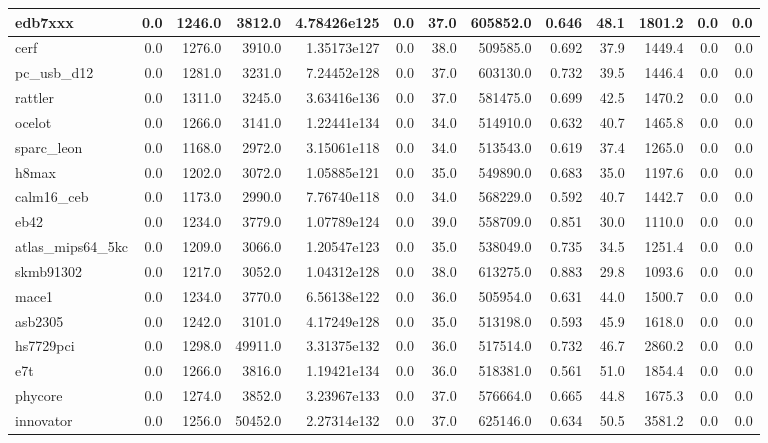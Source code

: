 \begin{tabular}{|l r r r r| r r r r r r | r r|}
\hline
edb7xxx & 0.0 & 1246.0 & 3812.0 & 4.78426e125 & 0.0 & 37.0 & 605852.0 & 0.646 & 48.1 & 1801.2 & 0.0 & 0.0 \\
\hline
cerf & 0.0 & 1276.0 & 3910.0 & 1.35173e127 & 0.0 & 38.0 & 509585.0 & 0.692 & 37.9 & 1449.4 & 0.0 & 0.0 \\
\hline
pc\_usb\_d12 & 0.0 & 1281.0 & 3231.0 & 7.24452e128 & 0.0 & 37.0 & 603130.0 & 0.732 & 39.5 & 1446.4 & 0.0 & 0.0 \\
\hline
rattler & 0.0 & 1311.0 & 3245.0 & 3.63416e136 & 0.0 & 37.0 & 581475.0 & 0.699 & 42.5 & 1470.2 & 0.0 & 0.0 \\
\hline
ocelot & 0.0 & 1266.0 & 3141.0 & 1.22441e134 & 0.0 & 34.0 & 514910.0 & 0.632 & 40.7 & 1465.8 & 0.0 & 0.0 \\
\hline
sparc\_leon & 0.0 & 1168.0 & 2972.0 & 3.15061e118 & 0.0 & 34.0 & 513543.0 & 0.619 & 37.4 & 1265.0 & 0.0 & 0.0 \\
\hline
h8max & 0.0 & 1202.0 & 3072.0 & 1.05885e121 & 0.0 & 35.0 & 549890.0 & 0.683 & 35.0 & 1197.6 & 0.0 & 0.0 \\
\hline
calm16\_ceb & 0.0 & 1173.0 & 2990.0 & 7.76740e118 & 0.0 & 34.0 & 568229.0 & 0.592 & 40.7 & 1442.7 & 0.0 & 0.0 \\
\hline
eb42 & 0.0 & 1234.0 & 3779.0 & 1.07789e124 & 0.0 & 39.0 & 558709.0 & 0.851 & 30.0 & 1110.0 & 0.0 & 0.0 \\
\hline
atlas\_mips64\_5kc & 0.0 & 1209.0 & 3066.0 & 1.20547e123 & 0.0 & 35.0 & 538049.0 & 0.735 & 34.5 & 1251.4 & 0.0 & 0.0 \\
\hline
skmb91302 & 0.0 & 1217.0 & 3052.0 & 1.04312e128 & 0.0 & 38.0 & 613275.0 & 0.883 & 29.8 & 1093.6 & 0.0 & 0.0 \\
\hline
mace1 & 0.0 & 1234.0 & 3770.0 & 6.56138e122 & 0.0 & 36.0 & 505954.0 & 0.631 & 44.0 & 1500.7 & 0.0 & 0.0 \\
\hline
asb2305 & 0.0 & 1242.0 & 3101.0 & 4.17249e128 & 0.0 & 35.0 & 513198.0 & 0.593 & 45.9 & 1618.0 & 0.0 & 0.0 \\
\hline
hs7729pci & 0.0 & 1298.0 & 49911.0 & 3.31375e132 & 0.0 & 36.0 & 517514.0 & 0.732 & 46.7 & 2860.2 & 0.0 & 0.0 \\
\hline
e7t & 0.0 & 1266.0 & 3816.0 & 1.19421e134 & 0.0 & 36.0 & 518381.0 & 0.561 & 51.0 & 1854.4 & 0.0 & 0.0 \\
\hline
phycore & 0.0 & 1274.0 & 3852.0 & 3.23967e133 & 0.0 & 37.0 & 576664.0 & 0.665 & 44.8 & 1675.3 & 0.0 & 0.0 \\
\hline
innovator & 0.0 & 1256.0 & 50452.0 & 2.27314e132 & 0.0 & 37.0 & 625146.0 & 0.634 & 50.5 & 3581.2 & 0.0 & 0.0 \\

\end{tabular}
